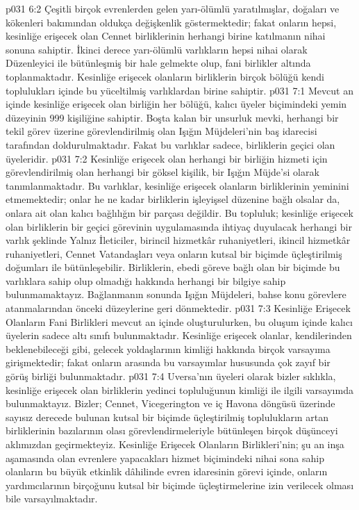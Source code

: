 \vs p031 6:2 Çeşitli birçok evrenlerden gelen yarı\hyp{}ölümlü yaratılmışlar, doğaları ve kökenleri bakımından oldukça değişkenlik göstermektedir; fakat onların hepsi, kesinliğe erişecek olan Cennet birliklerinin herhangi birine katılmanın nihai sonuna sahiptir. İkinci derece yarı\hyp{}ölümlü varlıkların hepsi nihai olarak Düzenleyici ile bütünleşmiş bir hale gelmekte olup, fani birlikler altında toplanmaktadır. Kesinliğe erişecek olanların birliklerin birçok bölüğü kendi toplulukları içinde bu yüceltilmiş varlıklardan birine sahiptir.
\vs p031 7:1 Mevcut an içinde kesinliğe erişecek olan birliğin her bölüğü, kalıcı üyeler biçimindeki yemin düzeyinin 999 kişiliğine sahiptir. Boşta kalan bir unsurluk mevki, herhangi bir tekil görev üzerine görevlendirilmiş olan Işığın Müjdeleri’nin baş idarecisi tarafından doldurulmaktadır. Fakat bu varlıklar sadece, birliklerin geçici olan üyeleridir.
\vs p031 7:2 Kesinliğe erişecek olan herhangi bir birliğin hizmeti için görevlendirilmiş olan herhangi bir göksel kişilik, bir Işığın Müjde’si olarak tanımlanmaktadır. Bu varlıklar, kesinliğe erişecek olanların birliklerinin yeminini etmemektedir; onlar he ne kadar birliklerin işleyişsel düzenine bağlı olsalar da, onlara ait olan kalıcı bağlılığın bir parçası değildir. Bu topluluk; kesinliğe erişecek olan birliklerin bir geçici görevinin uygulamasında ihtiyaç duyulacak herhangi bir varlık şeklinde Yalnız İleticiler, birincil hizmetkâr ruhaniyetleri, ikincil hizmetkâr ruhaniyetleri, Cennet Vatandaşları veya onların kutsal bir biçimde üçleştirilmiş doğumları ile bütünleşebilir. Birliklerin, ebedi göreve bağlı olan bir biçimde bu varlıklara sahip olup olmadığı hakkında herhangi bir bilgiye sahip bulunmamaktayız. Bağlanmanın sonunda Işığın Müjdeleri, bahse konu görevlere atanmalarından önceki düzeylerine geri dönmektedir.
\vs p031 7:3 Kesinliğe Erişecek Olanların Fani Birlikleri mevcut an içinde oluşturulurken, bu oluşum içinde kalıcı üyelerin sadece altı sınıfı bulunmaktadır. Kesinliğe erişecek olanlar, kendilerinden beklenebileceği gibi, gelecek yoldaşlarının kimliği hakkında birçok varsayıma girişmektedir; fakat onların arasında bu varsayımlar hususunda çok zayıf bir görüş birliği bulunmaktadır.
\vs p031 7:4 Uversa’nın üyeleri olarak bizler sıklıkla, kesinliğe erişecek olan birliklerin yedinci topluluğunun kimliği ile ilgili varsayımda bulunmaktayız. Bizler; Cennet, Vicegerington ve iç Havona döngüsü üzerinde sayısız derecede bulunan kutsal bir biçimde üçleştirilmiş toplulukların artan birliklerinin bazılarının olası görevlendirmeleriyle bütünleşen birçok düşünceyi aklımızdan geçirmekteyiz. Kesinliğe Erişecek Olanların Birlikleri’nin; şu an inşa aşamasında olan evrenlere yapacakları hizmet biçimindeki nihai sona sahip olanların bu büyük etkinlik dâhilinde evren idaresinin görevi içinde, onların yardımcılarının birçoğunu kutsal bir biçimde üçleştirmelerine izin verilecek olması bile varsayılmaktadır.
